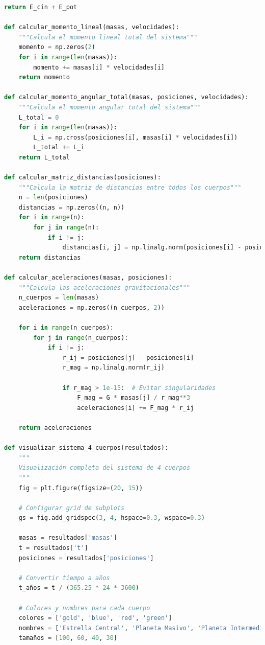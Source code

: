 \documentclass{article}
\begin{document}
\begin{lstlisting}[language=Python, caption={Sistema completo de 4 cuerpos con análisis dinámico}]
    return E_cin + E_pot

def calcular_momento_lineal(masas, velocidades):
    """Calcula el momento lineal total del sistema"""
    momento = np.zeros(2)
    for i in range(len(masas)):
        momento += masas[i] * velocidades[i]
    return momento

def calcular_momento_angular_total(masas, posiciones, velocidades):
    """Calcula el momento angular total del sistema"""
    L_total = 0
    for i in range(len(masas)):
        L_i = np.cross(posiciones[i], masas[i] * velocidades[i])
        L_total += L_i
    return L_total

def calcular_matriz_distancias(posiciones):
    """Calcula la matriz de distancias entre todos los cuerpos"""
    n = len(posiciones)
    distancias = np.zeros((n, n))
    for i in range(n):
        for j in range(n):
            if i != j:
                distancias[i, j] = np.linalg.norm(posiciones[i] - posiciones[j])
    return distancias

def calcular_aceleraciones(masas, posiciones):
    """Calcula las aceleraciones gravitacionales"""
    n_cuerpos = len(masas)
    aceleraciones = np.zeros((n_cuerpos, 2))
    
    for i in range(n_cuerpos):
        for j in range(n_cuerpos):
            if i != j:
                r_ij = posiciones[j] - posiciones[i]
                r_mag = np.linalg.norm(r_ij)
                
                if r_mag > 1e-15:  # Evitar singularidades
                    F_mag = G * masas[j] / r_mag**3
                    aceleraciones[i] += F_mag * r_ij
    
    return aceleraciones

def visualizar_sistema_4_cuerpos(resultados):
    """
    Visualización completa del sistema de 4 cuerpos
    """
    fig = plt.figure(figsize=(20, 15))
    
    # Configurar grid de subplots
    gs = fig.add_gridspec(3, 4, hspace=0.3, wspace=0.3)
    
    masas = resultados['masas']
    t = resultados['t']
    posiciones = resultados['posiciones']
    
    # Convertir tiempo a años
    t_años = t / (365.25 * 24 * 3600)
    
    # Colores y nombres para cada cuerpo
    colores = ['gold', 'blue', 'red', 'green']
    nombres = ['Estrella Central', 'Planeta Masivo', 'Planeta Intermedio', 'Planeta Pequeño']
    tamaños = [100, 60, 40, 30]
    

\end{lstlisting}
\end{document}
